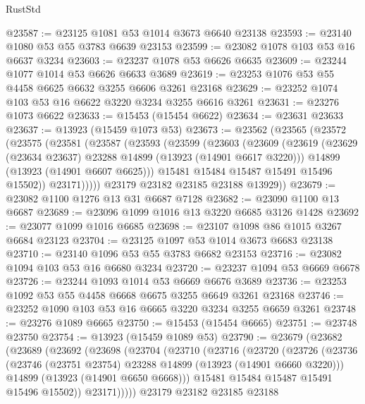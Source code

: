 \begin{lexlean}{RustStd}
\begin{coremodule}
@23587 := @23125 @1081 @53 @1014 @3673 @6640 @23138
@23593 := @23140 @1080 @53 @55 @3783 @6639 @23153
@23599 := @23082 @1078 @103 @53 @16 @6637 @3234
@23603 := @23237 @1078 @53 @6626 @6635
@23609 := @23244 @1077 @1014 @53 @6626 @6633 @3689
@23619 := @23253 @1076 @53 @55 @4458 @6625 @6632 @3255 @6606 @3261 @23168
@23629 := @23252 @1074 @103 @53 @16 @6622 @3220 @3234 @3255 @6616 @3261
@23631 := @23276 @1073 @6622
@23633 := @15453 (@15454 @6622)
@23634 := @23631 @23633
@23637 := @13923 (@15459 @1073 @53)
@23673 := @23562
    (@23565
      (@23572
        (@23575
          (@23581
            (@23587
              (@23593
                (@23599
                  (@23603
                    (@23609
                      (@23619
                        (@23629 (@23634 @23637) @23288 @14899 (@13923 (@14901 @6617 @3220)))
                        @14899
                        (@13923 (@14901 @6607 @6625)))
                      @15481
                      @15484
                      @15487
                      @15491
                      @15496
                      @15502))
                  @23171)))))
        @23179
        @23182
        @23185
        @23188
        @13929))
@23679 := @23082 @1100 @1276 @13 @31 @6687 @7128
@23682 := @23090 @1100 @13 @6687
@23689 := @23096 @1099 @1016 @13 @3220 @6685 @3126 @1428
@23692 := @23077 @1099 @1016 @6685
@23698 := @23107 @1098 @86 @1015 @3267 @6684 @23123
@23704 := @23125 @1097 @53 @1014 @3673 @6683 @23138
@23710 := @23140 @1096 @53 @55 @3783 @6682 @23153
@23716 := @23082 @1094 @103 @53 @16 @6680 @3234
@23720 := @23237 @1094 @53 @6669 @6678
@23726 := @23244 @1093 @1014 @53 @6669 @6676 @3689
@23736 := @23253 @1092 @53 @55 @4458 @6668 @6675 @3255 @6649 @3261 @23168
@23746 := @23252 @1090 @103 @53 @16 @6665 @3220 @3234 @3255 @6659 @3261
@23748 := @23276 @1089 @6665
@23750 := @15453 (@15454 @6665)
@23751 := @23748 @23750
@23754 := @13923 (@15459 @1089 @53)
@23790 := @23679
    (@23682
      (@23689
        (@23692
          (@23698
            (@23704
              (@23710
                (@23716
                  (@23720
                    (@23726
                      (@23736
                        (@23746 (@23751 @23754) @23288 @14899 (@13923 (@14901 @6660 @3220)))
                        @14899
                        (@13923 (@14901 @6650 @6668)))
                      @15481
                      @15484
                      @15487
                      @15491
                      @15496
                      @15502))
                  @23171)))))
        @23179
        @23182
        @23185
        @23188

\end{coremodule}
\end{lexlean}
